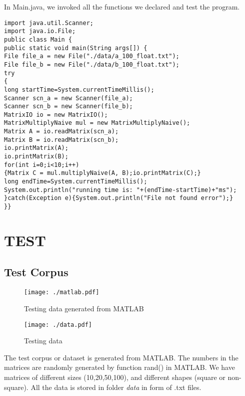 \documentclass[12pt]{article}
\begin{document}
	In Main.java, we invoked all the functions we declared and test the program.
	\begin{lstlisting}[title=Main.java]
import java.util.Scanner;
import java.io.File;
public class Main {
public static void main(String args[]) {
File file_a = new File("./data/a_100_float.txt");
File file_b = new File("./data/b_100_float.txt");	
try
{
long startTime=System.currentTimeMillis();
Scanner scn_a = new Scanner(file_a);
Scanner scn_b = new Scanner(file_b);
MatrixIO io = new MatrixIO();
MatrixMultiplyNaive mul = new MatrixMultiplyNaive();
Matrix A = io.readMatrix(scn_a);
Matrix B = io.readMatrix(scn_b);
io.printMatrix(A);
io.printMatrix(B);        
for(int i=0;i<10;i++)
{Matrix C = mul.multiplyNaive(A, B);io.printMatrix(C);}
long endTime=System.currentTimeMillis(); 
System.out.println("running time is: "+(endTime-startTime)+"ms");
}catch(Exception e){System.out.println("File not found error");}		
}}
	\end{lstlisting}
	\section{TEST}
	\subsection{Test Corpus}
		\begin{figure}[htbp]
		\centering
		\texttt{[image: ./matlab.pdf]}
		\caption{Testing data generated from MATLAB}
	\end{figure}
	\begin{figure}[htbp]
		\centering
		\texttt{[image: ./data.pdf]}
		\caption{Testing data}
	\end{figure}
	The test corpus or dataset is generated from MATLAB. The numbers in the matrices are randomly generated by function rand() in MATLAB. We have matrices of different sizes (10,20,50,100), and different shapes (square or non-square). All the data is stored in folder \textit{data} in form of .txt files.
\end{document}
